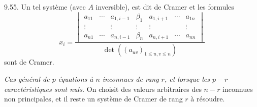 \medskip\noindent\textsc{9.55.} Un tel système (avec $A$ inversible), est dit de Cramer et les formules
\[
x_i=\frac{
\begin{vmatrix}
a_{11}&\cdots&a_{1,i-1}&\beta_1&a_{1,i+1}&\cdots&a_{1n}\\
\vdots&&\vdots&\vdots&\vdots&&\vdots\\
a_{n1}&\cdots&a_{n,i-1}&\beta_n&a_{n,i+1}&\cdots&a_{nn}
\end{vmatrix}}
{\det((a_{uv})_{1\le u,v\le n})}
\]
sont  de Cramer.

\emph{Cas général de $p$ équations à $n$ inconnues de rang $r$, et lorsque les $p-r$ caractéristiques sont nuls.} On choisit des valeurs arbitraires des $n-r$ inconnues non principales, et il reste un système de Cramer de rang $r$ à résoudre.
